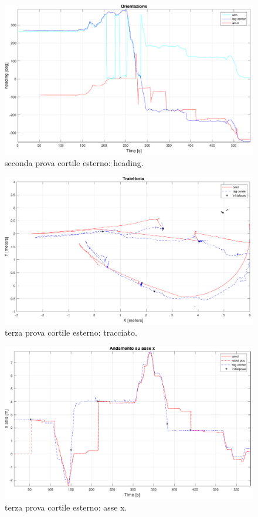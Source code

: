 \begin{figure}[] 
	\centering    
	\includegraphics[width=.8\textwidth]{figs/grafici_cortile/prova2/figure4.pdf}
	\caption{seconda prova cortile esterno: heading.}
	\label{fig. or seconda prova esterno}
\end{figure}

\begin{figure}[] 
	\centering    
	\includegraphics[width=.8\textwidth]{figs/grafici_cortile/prova3/figure1.pdf}
	\caption{terza prova cortile esterno: tracciato.}
	\label{fig. percorso terza prova esterno}
\end{figure}

\begin{figure}[] 
	\centering    
	\includegraphics[width=.8\textwidth]{figs/grafici_cortile/prova3/figure2.pdf}
	\caption{terza prova cortile esterno: asse x.}
	\label{fig. x terza prova esterno}
\end{figure}

